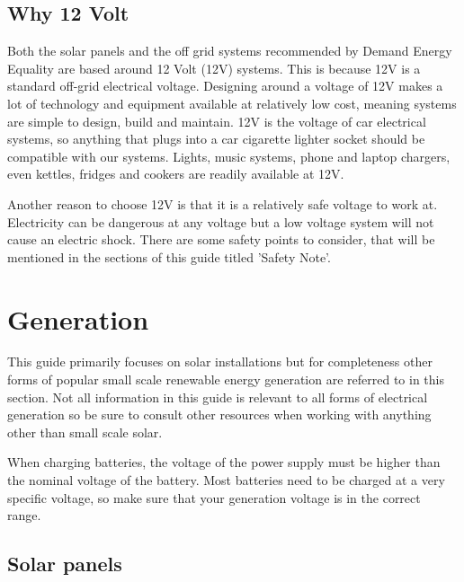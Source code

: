 \documentclass{article}
\theoremstyle{definition}
\theoremstyle{definition}
\theoremstyle{remark}
\begin{document}
  \subsection{Why 12 Volt} %
  \label{sub:why_12_volt}

    Both the solar panels and the off grid systems recommended by Demand Energy Equality are based around 12 Volt (12V) systems. This is because 12V is a standard off-grid electrical voltage. Designing around a voltage of 12V makes a lot of technology and equipment available at relatively low cost, meaning systems are simple to design, build and maintain. 12V is the voltage of car electrical systems, so anything that plugs into a car cigarette lighter socket should be compatible with our systems. Lights, music systems, phone and laptop chargers, even kettles, fridges and cookers are readily available at 12V. 

    Another reason to choose 12V is that it is a relatively safe voltage to work at. Electricity can be dangerous at any voltage but a low voltage system will not cause an electric shock. There are some safety points to consider, that will be mentioned in the sections of this guide titled 'Safety Note'.



\section{Generation} %
\label{sec:generation}

  This guide primarily focuses on solar installations but for completeness other forms of popular small scale renewable energy generation are referred to in this section. Not all information in this guide is relevant to all forms of electrical generation so be sure to consult other resources when working with anything other than small scale solar.

  When charging batteries, the voltage of the power supply must be higher than the nominal voltage of the battery. Most batteries need to be charged at a very specific voltage, so make sure that your generation voltage is in the correct range. 

  \subsection{Solar panels} %
  \label{sub:solar_panels}
\end{document}
